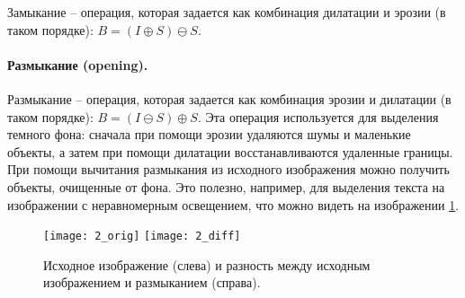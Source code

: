 Замыкание -- операция, которая задается как комбинация дилатации и эрозии (в таком порядке): $B = (I \oplus S) \ominus S$.

\paragraph{Размыкание (opening).}

Размыкание -- операция, которая задается как комбинация эрозии и дилатации (в таком порядке): $B = (I \ominus S) \oplus S$. Эта операция используется для выделения темного фона: сначала при помощи эрозии удаляются шумы и маленькие объекты, а затем при помощи дилатации восстанавливаются удаленные границы. При помощи вычитания размыкания из исходного изображения можно получить объекты, очищенные от фона. Это полезно, например, для выделения текста на изображении с неравномерным освещением, что можно видеть на изображении \ref{opening_demo}.

\begin{figure}[!h]
    \centering
    \texttt{[image: 2\_orig]}
    \texttt{[image: 2\_diff]}
    \caption{Исходное изображение (слева) и разность между исходным изображением и размыканием (справа).}
    \label{opening_demo}
\end{figure}

